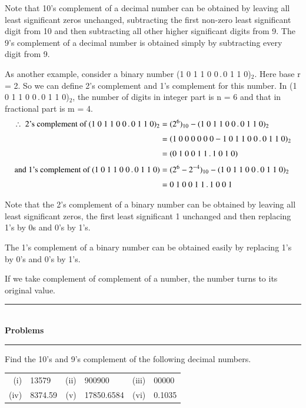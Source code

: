 Note that 10's complement of a decimal number can be obtained by leaving all least significant zeros unchanged, subtracting the first non-zero least significant digit from 10 and then subtracting all other higher significant digits from 9. The 9's complement of a decimal number is obtained simply by subtracting every digit from 9.

As another example, consider a binary number (1 0 1 1 0 0\,.\,0 1 1 0)$_{2}$. Here base r = 2. So we can define 2's complement and 1's complement for this number. In (1 0 1 1 0 0\,.\,0 1 1 0)$_{2}$, the number of digits in integer part is n = 6 and that in fractional part is m = 4.
\begin{align*}
\therefore~ \text{2's complement of } (1~0~1~1~0~0\,.\,0~1~1~0)_{2} &= (2^{6})_{10}-(1~0~1~1~0~0\,.\,0~1~1~0)_{2}\\[3pt]
&= (1~0~0~0~0~0~0 - 1~0~1~1~0~0\,.\,0~1~1~0)_{2}\\[3pt]
&= (0~1~0~0~1~1\,.\,1~0~1~0)\\[3pt]
\text{and 1's complement of (1 0 1 1 0 0\,.\,0 1 1 0)} &=(2^{6}-2^{-4})_{10}-(1~0~1~1~0~0\,.\,0~1~1~0)_{2}\\[3pt]
&= 0~1~0~0~1~1\,.\,1~0~0~1
\end{align*}

Note that the 2's complement of a binary number can be obtained by leaving all least significant zeros, the first least significant 1 unchanged and then replacing 1's by 0s and 0's by 1's.

The 1's complement of a binary number can be obtained easily by replacing 1's by 0's and 0's by 1's.
\begin{note}
If we take complement of complement of a number, the number turns to its original value.
\end{note}
\begin{center}
\rule{4cm}{1pt}\\
{\bf\Large Problems}\\[-3pt]
\rule{4cm}{1pt}
\end{center}

\begin{problem}\label{prob5.23}
Find the 10's and 9's complement of the following decimal numbers.
\begin{center}
\begin{tabular}{r@{\;}l@{\qquad}r@{\;}l@{\qquad}r@{\;}l}
(i) & 13579 & (ii) & 900900 & (iii) &  00000\\[4pt]
(iv) & 8374.59 & (v) & 17850.6584 & (vi) & 0.1035
\end{tabular}
\end{center}
\end{problem}

